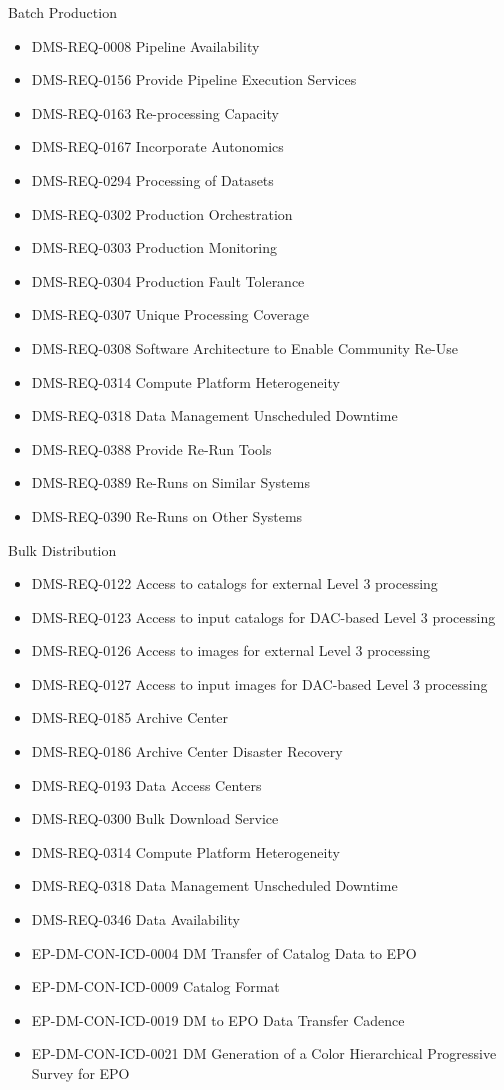 Batch Production \begin{itemize}
\item DMS-REQ-0008 Pipeline Availability
\item DMS-REQ-0156 Provide Pipeline Execution Services
\item DMS-REQ-0163 Re-processing Capacity
\item DMS-REQ-0167 Incorporate Autonomics
\item DMS-REQ-0294 Processing of Datasets
\item DMS-REQ-0302 Production Orchestration
\item DMS-REQ-0303 Production Monitoring
\item DMS-REQ-0304 Production Fault Tolerance
\item DMS-REQ-0307 Unique Processing Coverage
\item DMS-REQ-0308 Software Architecture to Enable Community Re-Use
\item DMS-REQ-0314 Compute Platform Heterogeneity
\item DMS-REQ-0318 Data Management Unscheduled Downtime
\item DMS-REQ-0388 Provide Re-Run Tools
\item DMS-REQ-0389 Re-Runs on Similar Systems
\item DMS-REQ-0390 Re-Runs on Other Systems
\end{itemize}
Bulk Distribution \begin{itemize}
\item DMS-REQ-0122 Access to catalogs for external Level 3 processing
\item DMS-REQ-0123 Access to input catalogs for DAC-based Level 3 processing
\item DMS-REQ-0126 Access to images for external Level 3 processing
\item DMS-REQ-0127 Access to input images for DAC-based Level 3 processing
\item DMS-REQ-0185 Archive Center
\item DMS-REQ-0186 Archive Center Disaster Recovery
\item DMS-REQ-0193 Data Access Centers
\item DMS-REQ-0300 Bulk Download Service
\item DMS-REQ-0314 Compute Platform Heterogeneity
\item DMS-REQ-0318 Data Management Unscheduled Downtime
\item DMS-REQ-0346 Data Availability
\item EP-DM-CON-ICD-0004 DM Transfer of Catalog Data to EPO
\item EP-DM-CON-ICD-0009 Catalog Format
\item EP-DM-CON-ICD-0019 DM to EPO Data Transfer Cadence
\item EP-DM-CON-ICD-0021 DM Generation of a Color Hierarchical Progressive Survey for EPO
\end{itemize}
